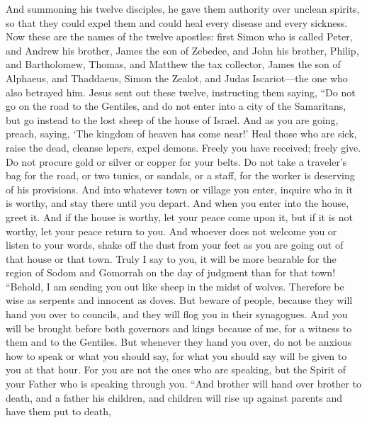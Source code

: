 \begin{biblechapter} %
 And summoning his twelve disciples, he gave them authority over unclean spirits, so that they could expel them and could heal every disease and every sickness.
\verse Now these are the names of the twelve apostles: first Simon who is called Peter, and Andrew his brother, James the son of Zebedee, and John his brother,
\verse Philip, and Bartholomew, Thomas, and Matthew the tax collector, James the son of Alphaeus, and Thaddaeus,
\verse Simon the Zealot, and Judas Iscariot—the one who also betrayed him.
\verse Jesus sent out these twelve, instructing them saying, “Do not go on the road to the Gentiles, and do not enter into a city of the Samaritans,
\verse but go instead to the lost sheep of the house of Israel.
\verse And as you are going, preach, saying, ‘The kingdom of heaven has come near!’
\verse Heal those who are sick, raise the dead, cleanse lepers, expel demons. Freely you have received; freely give.
\verse Do not procure gold or silver or copper for your belts.
\verse Do not take a traveler’s bag for the road, or two tunics, or sandals, or a staff, for the worker is deserving of his provisions.
\verse And into whatever town or village you enter, inquire who in it is worthy, and stay there until you depart.
\verse And when you enter into the house, greet it.
\verse And if the house is worthy, let your peace come upon it, but if it is not worthy, let your peace return to you.
\verse And whoever does not welcome you or listen to your words, shake off the dust from your feet as you are going out of that house or that town.
\verse Truly I say to you, it will be more bearable for the region of Sodom and Gomorrah on the day of judgment than for that town!
 “Behold, I am sending you out like sheep in the midst of wolves. Therefore be wise as serpents and innocent as doves.
\verse But beware of people, because they will hand you over to councils, and they will flog you in their synagogues.
\verse And you will be brought before both governors and kings because of me, for a witness to them and to the Gentiles.
\verse But whenever they hand you over, do not be anxious how to speak or what you should say, for what you should say will be given to you at that hour.
\verse For you are not the ones who are speaking, but the Spirit of your Father who is speaking through you.
\verse “And brother will hand over brother to death, and a father his children, and children will rise up against parents and have them put to death,

\end{biblechapter}
